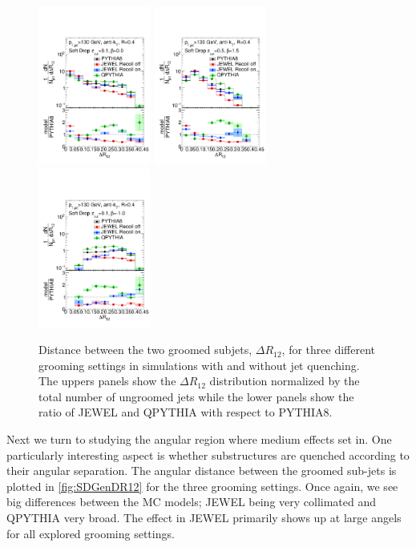 \begin{figure}[th!]
\centering
\includegraphics[width=0.33\textwidth]{figures/SDGen/DR12CompModelsBeta00Z01.pdf}%
\includegraphics[width=0.33\textwidth]{figures/SDGen/DR12CompModelsBeta15Z05.pdf}%
\includegraphics[width=0.33\textwidth]{figures/SDGen/DR12CompModelsBetam1Z01.pdf}%
\caption{Distance between the two groomed subjets, $\Delta R_{12}$, for three different grooming settings in simulations with and without jet quenching. The uppers panels show the $\Delta R_{\mathrm{12}}$ distribution normalized by the total number of ungroomed jets while the lower panels show the ratio of JEWEL and QPYTHIA with respect to PYTHIA8.}
\label{fig:SDGenDR12}
\end{figure}
Next we  turn to studying the angular region where medium effects set in. One particularly interesting aspect is whether substructures are quenched according to their angular separation. The angular distance between the groomed sub-jets is plotted in \autoref{fig:SDGenDR12} for the three grooming settings. Once again, we see big differences between the MC models; JEWEL being very collimated and QPYTHIA very broad. The effect in JEWEL primarily shows up at large angels for all explored grooming settings. 

